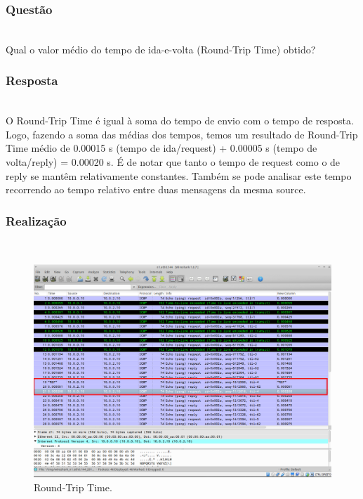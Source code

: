 \documentclass{llncs}
\begin{document}
\subsubsection{Questão}\rule[-10pt]{0pt}{10pt}\\

Qual o valor médio do tempo de ida-e-volta (Round-Trip Time) obtido?

\subsubsection{Resposta}\rule[-10pt]{0pt}{10pt}\\

O Round-Trip Time é igual à soma do tempo de envio com o tempo de resposta. Logo, fazendo a soma das médias dos tempos, temos um resultado de Round-Trip Time médio de 0.00015 s (tempo de ida/request) + 0.00005 s (tempo de volta/reply) = 0.00020 s. É de notar que tanto o tempo de request como o de reply se mantêm relativamente constantes. Também se pode analisar este tempo recorrendo ao tempo relativo entre duas mensagens da mesma source.

\subsubsection{Realização}\rule[-10pt]{0pt}{10pt}\\
\begin{figure}
	\begin{center}
	\includegraphics[scale=0.35]{imagens/roundtime.png} 
	\end{center}
	\caption{\label{fig:ip_source}Round-Trip Time.}
\end{figure} 
\end{document}
